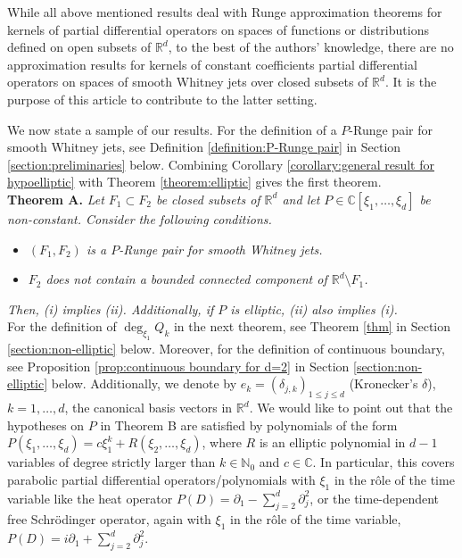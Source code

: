 \documentclass[10pt,leqno]{amsart}
\theoremstyle{definition}
\newcommand{\R}{\mathbb R}
\newcommand{\N}{\mathbb N}
\newcommand{\C}{\mathbb C}
\begin{document}
While all above mentioned results deal with Runge approximation theorems for kernels of partial differential operators on spaces of functions or distributions defined on open subsets of $\R^d$, to the best of the authors' knowledge, there are no approximation results for kernels of constant coefficients partial differential operators on spaces of smooth Whitney jets over closed subsets of $\R^d$. It is the purpose of this article to contribute to the latter setting. 

We now state a sample of our results. For the definition of a $P$-Runge pair for smooth Whitney jets, see Definition \ref{definition:P-Runge pair} in Section \ref{section:preliminaries} below. Combining Corollary \ref{corollary:general result for hypoelliptic} with Theorem \ref{theorem:elliptic} gives the first theorem.\\

\textbf{Theorem A.} \textit{Let $F_1\subset F_2$ be closed subsets of $\R^d$ and let $P\in\C[\xi_1,\ldots,\xi_d]$ be non-constant. Consider the following conditions.}
\begin{itemize}
	\item[(i)] \textit{$(F_1, F_2)$ is a $P$-Runge pair for smooth Whitney jets.}
	\item[(ii)] \textit{$F_2$ does not contain a bounded connected component of $\R^d\setminus F_1$.} 
\end{itemize}
\textit{Then, (i) implies (ii). Additionally, if $P$ is elliptic, (ii) also implies (i).}\\

For the definition of $\deg_{\xi_1} Q_k$ in the next theorem, see Theorem \ref{thm} in Section \ref{section:non-elliptic} below. Moreover, for the definition of continuous boundary, see Proposition \ref{prop:continuous boundary for d=2} in Section \ref{section:non-elliptic} below. Additionally, we denote by $e_k=(\delta_{j,k})_{1\leq j\leq d}$ (Kronecker's $\delta$), $k=1,\ldots, d$, the canonical basis vectors in $\R^d$. We would like to point out that the hypotheses on $P$ in Theorem B are satisfied by polynomials of the form $P(\xi_1,\ldots,\xi_d)=c\xi_1^k+R(\xi_2,\ldots,\xi_d)$, where $R$ is an elliptic polynomial in $d-1$ variables of degree strictly larger than $k\in\N_0$ and $c\in\C$. In particular, this covers parabolic partial differential operators/polynomials with $\xi_1$ in the r\^{o}le of the time variable like the heat operator $P(D)=\partial_1-\sum_{j=2}^d\partial_j^2$, or the time-dependent free Schr\"odinger operator, again with $\xi_1$ in the r\^{o}le of the time variable, $P(D)=i\partial_1+\sum_{j=2}^d \partial_j^2$. \\
\end{document}
